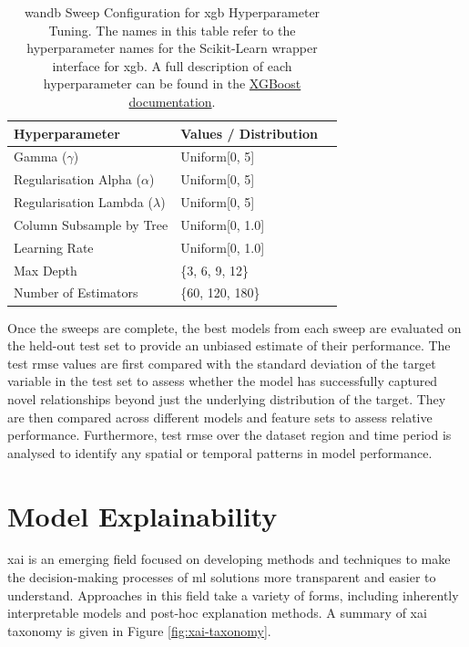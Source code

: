 \begin{table}[!ht]
    \centering
    \caption{\acrshort{wandb} Sweep Configuration for \acrshort{xgb} Hyperparameter Tuning. The names in this table refer to the hyperparameter names for the Scikit-Learn wrapper interface for \acrshort{xgb}. A full description of each hyperparameter can be found in the \href{https://xgboost.readthedocs.io/en/stable/python/python_api.html\#module-xgboost.sklearn}{XGBoost documentation}.}
    \label{tab:wandb-sweep-config}
    \begin{tabular}{llr}     
        \toprule
        \textbf{Hyperparameter} & \textbf{Values / Distribution} \\ 
        \midrule
        Gamma ($\gamma$) & Uniform[0, 5] \\
        Regularisation Alpha ($\alpha$) & Uniform[0, 5] \\
        Regularisation Lambda ($\lambda$) & Uniform[0, 5] \\
        Column Subsample by Tree & Uniform[0, 1.0] \\
        Learning Rate & Uniform[0, 1.0] \\
        Max Depth & \{3, 6, 9, 12\} \\
        Number of Estimators & \{60, 120, 180\} \\
        \bottomrule
    \end{tabular}
\end{table}

Once the sweeps are complete, the best models from each sweep are evaluated on the held-out test set to provide an unbiased estimate of their performance. The test \acrshort{rmse} values are first compared with the standard deviation of the target variable in the test set to assess whether the model has successfully captured novel relationships beyond just the underlying distribution of the target. They are then compared across different models and feature sets to assess relative performance. Furthermore, test \acrshort{rmse} over the dataset region and time period is analysed to identify any spatial or temporal patterns in model performance.

\section{Model Explainability}
\label{sec:model-explainability}

\acrfull{xai} is an emerging field focused on developing methods and techniques to make the decision-making processes of \acrshort{ml} solutions more transparent and easier to understand. Approaches in this field take a variety of forms, including inherently interpretable models and post-hoc explanation methods. A summary of \acrshort{xai} taxonomy is given in Figure \ref{fig:xai-taxonomy}.

